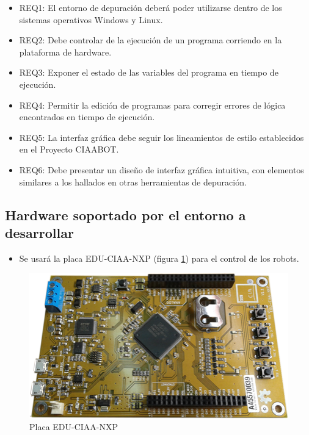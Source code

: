 \begin{itemize}
\item
REQ1: El entorno de depuración deberá poder utilizarse dentro de los sistemas operativos Windows y Linux.
\item
REQ2: Debe controlar de la ejecución de un programa corriendo en la plataforma de hardware.
\item
REQ3: Exponer el estado de las variables del programa en tiempo de ejecución.
\item
REQ4: Permitir la edición de programas para corregir errores de lógica encontrados en tiempo de ejecución.
\item
REQ5: La interfaz gráfica debe seguir los lineamientos de estilo establecidos en el Proyecto CIAABOT.
\item
REQ6: Debe presentar un diseño de interfaz gráfica intuitiva, con elementos similares a los hallados en otras herramientas de depuración.
\end{itemize}

\subsection{Hardware soportado por el entorno a desarrollar}

\begin{itemize}
	\item Se usará la placa EDU-CIAA-NXP (figura \ref{fig:edu-ciaa-nxp}) para el control de los robots.	
\end{itemize}

\begin{figure}[h]
	\centering
	\includegraphics[width=14cm]{./Figures/EDU-CIAA-NXP_Foto.png}
	\caption{Placa EDU-CIAA-NXP}
	\label{fig:edu-ciaa-nxp}
\end{figure}

